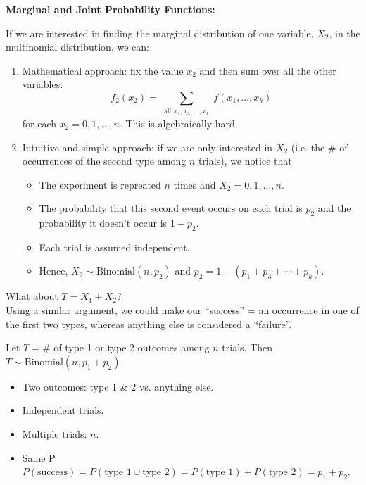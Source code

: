 \textbf{Marginal and Joint Probability Functions:}

If we are interested in finding the marginal distribution of one variable, $X_2$, in the multinomial distribution, we can:

\begin{enumerate}
    \item Mathematical approach: fix the value $x_2$ and then sum over all the other variables:
    \[
        f_2(x_2) = \displaystyle \sum_{\substack{\text{all }x_1,x_3,\ldots ,x_k}} f(x_1,\ldots ,x_k)
    \]
    for each $x_2 = 0,1,\ldots , n$. This is algebraically hard.

    \item Intuitive and simple approach: if we are only interested in $X_2$ (i.e. the $\#$ of occurrences of the second type among $n$ trials), we notice that
    \begin{itemize}
        \item The experiment is repreated $n$ times and $X_2 = 0,1,\ldots ,n$.
        \item The probability that this second event occurs on each trial is $p_2$ and the probability it doesn't occur is $1-p_2$.
        \item Each trial is assumed independent.
        \item Hence, $X_2 \sim \text{Binomial}(n,p_2)$ and $p_2 = 1 - (p_1 + p_3 + \cdots + p_k)$.
    \end{itemize}
\end{enumerate}

What about $T = X_1 + X_2$? \\
Using a similar argument, we could make our ``success'' =  an occurrence in one of the first two types, whereas anything else is considered a ``failure''.

Let $T = \#$ of type 1 or type 2 outcomes among $n$ trials. Then $T \sim \text{Binomial}(n,p_1 + p_2)$.
\begin{itemize}
    \item Two outcomes: type 1 \& 2 vs. anything else.
    \item Independent trials.
    \item Multiple trials: $n$.
    \item Same P $P(\text{success}) = P(\text{type 1} \cup \text{type 2}) = P(\text{type 1}) + P(\text{type 2}) = p_1 + p_2$.
\end{itemize}


\pagebreak

